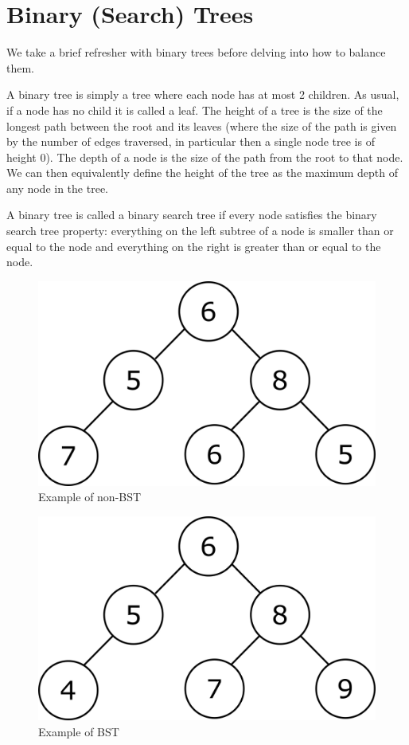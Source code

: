 \section{Binary (Search) Trees}
We take a brief refresher with binary trees before delving into how to balance them.

A binary tree is simply a tree where each node has at most 2 children. As usual, if a node has no child it is called a leaf. The height of a tree is the size of the longest path between the root and its leaves (where the size of the path is given by the number of edges traversed, in particular then a single node tree is of height 0). The depth of a node is the size of the path from the root to that node. We can then equivalently define the height of the tree as the maximum depth of any node in the tree.

A binary tree is called a binary search tree if every node satisfies the binary search tree property: everything on the left subtree of a node is smaller than or equal to the node and everything on the right is greater than or equal to the node.


\begin{figure}[h]
    \centering
    \includegraphics[scale=0.3]{Images/non_bst.png}
    \caption{Example of non-BST}
    \label{fig:non_bst}
\end{figure}
\begin{figure}[h]
    \centering
    \includegraphics[scale=0.3]{Images/bst_example.png}
    \caption{Example of BST}
    \label{fig:bst_example}
\end{figure}

